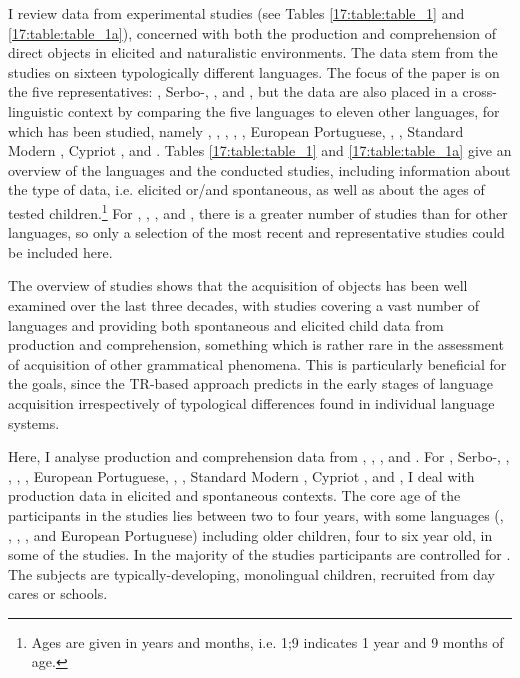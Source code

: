 \documentclass[output=paper,modfonts,newtxmath,hidelinks,]{langscibook}
\begin{document}
I review data from experimental studies (see Tables \ref{17:table:table_1} and \ref{17:table:table_1a}), concerned with both the production and comprehension of direct objects in elicited and naturalistic environments. The data stem from the studies on sixteen typologically different languages. The focus of the  paper is on the five  representatives: , Serbo-, ,  and , but the data are also placed in a cross-linguistic context by comparing the five  languages to eleven other languages, for which  has been studied, namely , , , , , European Portuguese, , , Standard Modern , Cypriot , and . Tables \ref{17:table:table_1} and \ref{17:table:table_1a} give an overview of the languages and the conducted studies, including information about the type of data, i.e. elicited or/and spontaneous, as well as about the ages of tested children.\footnote{\label{17:fn3}Ages are given in years and months, i.e. 1;9 indicates 1 year and 9 months of age.} For , , , and , there is a greater number of studies than for other languages, so only a selection of the most recent and representative studies could be included here.

The overview of studies shows that the acquisition of objects has been well examined over the last three decades, with studies covering a vast number of languages and providing both spontaneous and elicited child data from production and comprehension, something which is rather rare in the assessment of acquisition of other grammatical phenomena. This is particularly beneficial for the  goals, since the TR-based approach predicts  in the early stages of language acquisition irrespectively of typological differences found in individual language systems.\largerpage[-2]

Here, I analyse production and comprehension data from , , , and . For , Serbo-, , , , , European Portuguese, , , Standard Modern , Cypriot , and , I deal with production data in elicited and spontaneous contexts. The core age of the participants in the studies lies between two to four years, with some languages (, , , , and European Portuguese) including older children, four to six year old, in some of the studies. In the majority of the studies participants are controlled for . The subjects are typically-developing, monolingual children, recruited from day cares or schools.
\end{document}
